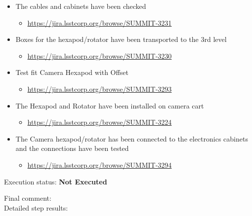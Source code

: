 \documentclass[SE,lsstdraft,STR,toc]{lsstdoc}
\providecommand{\tightlist}{
  \setlength{\itemsep}{0pt}\setlength{\parskip}{0pt}}
\begin{document}
\begin{itemize}
\tightlist
\item
  The cables and cabinets have been checked~

  \begin{itemize}
  \tightlist
  \item
    \url{https://jira.lsstcorp.org/browse/SUMMIT-3231}
  \end{itemize}
\item
  Boxes for the hexapod/rotator have been transported to the 3rd level

  \begin{itemize}
  \tightlist
  \item
    \url{https://jira.lsstcorp.org/browse/SUMMIT-3230}
  \end{itemize}
\item
  Test fit Camera Hexapod with Offset

  \begin{itemize}
  \tightlist
  \item
    \url{https://jira.lsstcorp.org/browse/SUMMIT-3293}
  \end{itemize}
\item
  The Hexapod and Rotator have been installed on camera cart

  \begin{itemize}
  \tightlist
  \item
    \url{https://jira.lsstcorp.org/browse/SUMMIT-3224}
  \end{itemize}
\item
  The Camera hexapod/rotator has been connected to the electronics
  cabinets and the connections have been tested

  \begin{itemize}
  \tightlist
  \item
    \url{https://jira.lsstcorp.org/browse/SUMMIT-3294}
  \end{itemize}
\end{itemize}


    Execution status: {\bf Not Executed }

    Final comment:\\


    Detailed step results:
\end{document}
